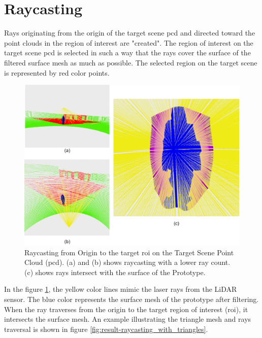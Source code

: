 \section{Raycasting}
Rays originating from the origin of the target scene \acrshort{pcd} and directed toward the point clouds in the region of interest are "created". The region of interest on the target scene \acrshort{pcd} is selected in such a way that the rays cover the surface of the filtered surface mesh as much as possible. The selected region on the target scene is represented by red color points.

\begin{figure}[htbp]
    \centering
    \includegraphics[width=1\linewidth]{97_graphics/results/raycasting_from_origin.pdf}
    \caption[Raycasting from Origin to the target \acrshort{roi} on the Target Scene Point Cloud (\acrshort{pcd}).]{Raycasting from Origin to the target \acrshort{roi} on the Target Scene Point Cloud (\acrshort{pcd}). (a) and (b) shows raycasting with a lower ray count. (c) shows rays intersect with the surface of the Prototype.}
    \label{fig:result-raycasting_from_origin}
\end{figure}

In the figure \ref{fig:result-raycasting_from_origin}, the yellow color lines mimic the laser rays from the LiDAR sensor. The blue color represents the surface mesh of the prototype after filtering. When the ray traverses from the origin to the target region of interest (\acrshort{roi}), it intersects the surface mesh. An example illustrating the triangle mesh and rays traversal is shown in figure \ref{fig:result-raycasting_with_triangles}.

